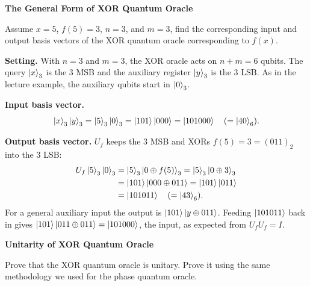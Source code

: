 \documentclass[a4paper, 10pt]{article}
\begin{document}
\subject
{}

\begin{problem}
\textbf{The General Form of XOR Quantum Oracle}
\par Assume \( x = 5 \), \( f(5) = 3 \), \( n = 3 \), and \( m = 3 \),
find the corresponding input and output basis vectors of the XOR quantum oracle corresponding to \( f(x) \).
\end{problem}

\begin{solution}
	\noindent \textbf{Setting.} With \( n = 3 \) and \( m = 3 \), the XOR oracle acts on \( n + m = 6 \) qubits. The query \( \ket{x}_3 \) is the 3 MSB and the auxiliary register \( \ket{y}_3 \) is the 3 LSB.
	As in the lecture example, the auxiliary qubits start in \( \ket{0}_3 \).

	\myspace

	\noindent \textbf{Input basis vector.}
	\[
		\ket{x}_3\ket{y}_3 = \ket{5}_3\ket{0}_3 = \ket{101}\ket{000} = \ket{101000} \quad (= \ket{40}_6).
	\]

	\noindent \textbf{Output basis vector.} \( U_f \) keeps the 3 MSB and XORs \( f(5) = 3 = (011)_2 \) into the 3 LSB:
	\begin{align*}
		U_f\ket{5}_3\ket{0}_3 & = \ket{5}_3\ket{0 \oplus f(5)}_3 = \ket{5}_3\ket{0 \oplus 3}_3 \\
		                      & = \ket{101}\ket{000 \oplus 011} = \ket{101}\ket{011}           \\
		                      & = \ket{101011} \quad (= \ket{43}_6).
	\end{align*}
	For a general auxiliary input the output is \( \ket{101}\ket{y \oplus 011} \). Feeding \( \ket{101011} \) back in gives \( \ket{101}\ket{011 \oplus 011} = \ket{101000} \), the input, as expected from \( U_fU_f = I \).
\end{solution}

\begin{problem}
\textbf{Unitarity of XOR Quantum Oracle}
\par Prove that the XOR quantum oracle is unitary.
Prove it using the same methodology we used for the phase quantum oracle.
\end{problem}
\end{document}
